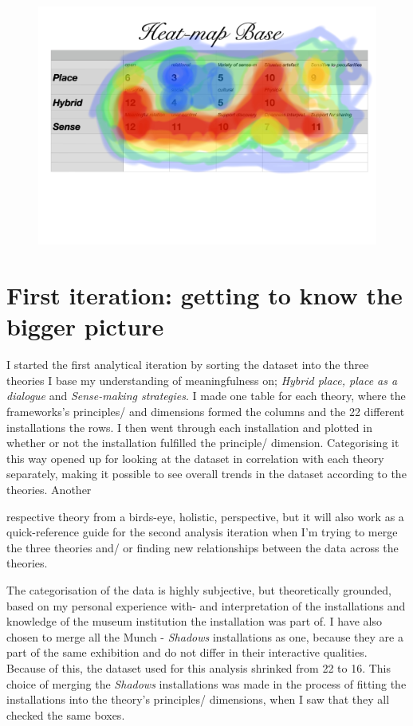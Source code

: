 \begin{figure}[H]
\includegraphics[width=13cm]{pictures/dataset/heatmap.jpg}
\centering 
\end{figure}


\section{First iteration: getting to know the bigger picture}

I started the first analytical iteration by sorting the dataset into the three theories I base my understanding of meaningfulness on; \emph{Hybrid place, place as a dialogue} and \emph{Sense-making strategies}. I made one table for each theory, where the frameworks's principles/ and dimensions formed the columns and the 22 different installations the rows. I then went through each installation and plotted in whether or not the installation fulfilled the principle/ dimension. Categorising it this way opened up for looking at the dataset in correlation with each theory separately, making it possible to see overall trends in the dataset according to the theories. Another


respective theory from a birds-eye, holistic, perspective, but it will also work as a quick-reference guide for the second analysis iteration when I'm trying to merge the three theories and/ or finding new relationships between the data across the theories.

The categorisation of the data is highly subjective, but theoretically grounded, based on my personal experience with- and interpretation of the installations and knowledge of the museum institution the installation was part of. I have also chosen to merge all the Munch - \emph{Shadows} installations as one, because they are a part of the same exhibition and do not differ in their interactive qualities. Because of this, the dataset used for this analysis shrinked from 22 to 16. This choice of merging the \emph{Shadows} installations was made in the process of fitting the installations into the theory's principles/ dimensions, when I saw that they all checked the same boxes. 


